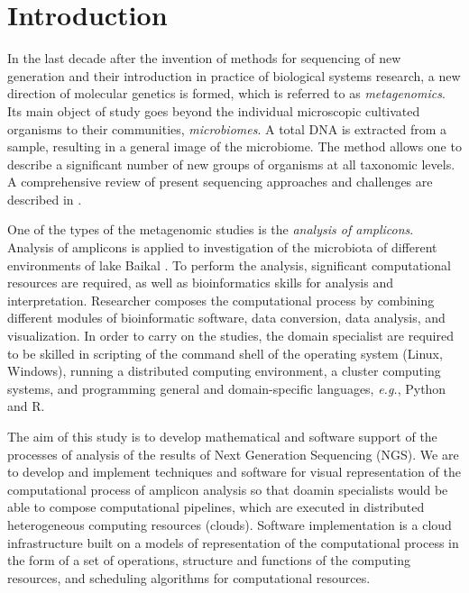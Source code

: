 \documentclass[a4paper]{jpconf}
\begin{document}

\section{Introduction}


In the last decade after the invention of methods for sequencing of new generation and their introduction in practice of biological systems research, a new direction of molecular genetics is formed, which is referred to as \emph{metagenomics}. Its main object of study goes beyond the individual microscopic cultivated organisms to their communities, \emph{microbiomes}. A total DNA is extracted from a sample, resulting in a general image of the microbiome. The method allows one to describe a significant number of new groups of organisms at all taxonomic levels. A comprehensive review of present sequencing approaches and challenges are described in \cite{pere20}.

One of the types of the metagenomic studies is the \emph{analysis of amplicons}. Analysis of amplicons is applied to investigation of the microbiota of different environments of lake Baikal \cite{underice}. To perform the analysis, significant computational resources are required, as well as bioinformatics skills for analysis and interpretation. Researcher composes the computational process by combining different modules of bioinformatic software, data conversion, data analysis, and visualization. In order to carry on the studies, the domain specialist are required to be skilled in scripting of the command shell of the operating system (Linux, Windows), running a distributed computing environment, a cluster computing systems, and programming general and domain-specific languages, \emph{e.g.}, Python and R.

The aim of this study is to develop mathematical and software support of the processes of analysis of the results of Next Generation Sequencing (NGS). We are to develop and implement techniques and software for visual representation of the computational process of amplicon analysis so that doamin specialists would be able to compose computational pipelines, which are executed in distributed heterogeneous computing resources (clouds).  Software implementation is a cloud infrastructure built on a models of representation of the computational process in the form of a set of operations, structure and functions of the computing resources, and scheduling algorithms for computational resources.
\end{document}
